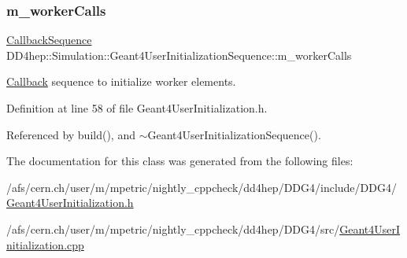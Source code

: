 \hypertarget{class_d_d4hep_1_1_simulation_1_1_geant4_user_initialization_sequence_a85de09bfc3a69485391fb549a457cf7e}{}\label{class_d_d4hep_1_1_simulation_1_1_geant4_user_initialization_sequence_a85de09bfc3a69485391fb549a457cf7e} 
\subsubsection{\texorpdfstring{m\+\_\+worker\+Calls}{m\_workerCalls}}
{\footnotesize\ttfamily \hyperlink{struct_d_d4hep_1_1_callback_sequence}{Callback\+Sequence} D\+D4hep\+::\+Simulation\+::\+Geant4\+User\+Initialization\+Sequence\+::m\+\_\+worker\+Calls\hspace{0.3cm}{\ttfamily [protected]}}



\hyperlink{class_d_d4hep_1_1_callback}{Callback} sequence to initialize worker elements. 



Definition at line 58 of file Geant4\+User\+Initialization.\+h.



Referenced by build(), and $\sim$\+Geant4\+User\+Initialization\+Sequence().



The documentation for this class was generated from the following files\+:\begin{DoxyCompactItemize}
\item 
/afs/cern.\+ch/user/m/mpetric/nightly\+\_\+cppcheck/dd4hep/\+D\+D\+G4/include/\+D\+D\+G4/\hyperlink{_geant4_user_initialization_8h}{Geant4\+User\+Initialization.\+h}\item 
/afs/cern.\+ch/user/m/mpetric/nightly\+\_\+cppcheck/dd4hep/\+D\+D\+G4/src/\hyperlink{_geant4_user_initialization_8cpp}{Geant4\+User\+Initialization.\+cpp}\end{DoxyCompactItemize}
